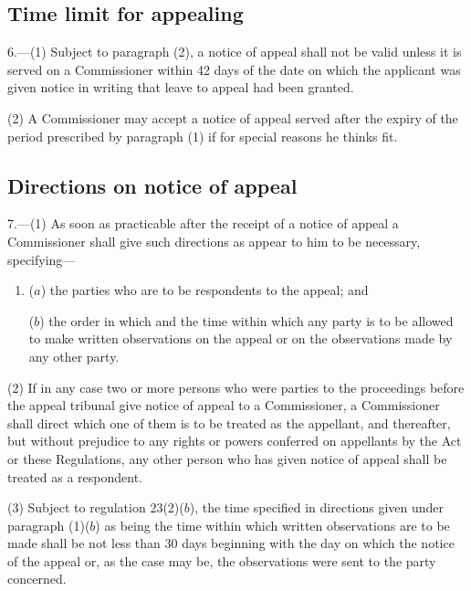 \documentclass[12pt,a4paper]{article}
\begin{document}

\subsection[6. Time limit for appealing]{Time limit for appealing}

6.—(1) Subject to paragraph (2), a notice of appeal shall not be valid unless it is served on a Commissioner within 42 days of the date on which the applicant was given notice in writing that leave to appeal had been granted.

(2) A Commissioner may accept a notice of appeal served after the expiry of the period prescribed by paragraph (1) if for special reasons he thinks fit.

\subsection[7. Directions on notice of appeal]{Directions on notice of appeal}

7.—(1) As soon as practicable after the receipt of a notice of appeal a Commissioner shall give such directions as appear to him to be necessary, specifying—
\begin{enumerate}\item[]
($a$) the parties who are to be respondents to the appeal; and

($b$) the order in which and the time within which any party is to be allowed to make written observations on the appeal or on the observations made by any other party.
\end{enumerate}

(2) If in any case two or more persons who were parties to the proceedings before the appeal tribunal give notice of appeal to a Commissioner, a Commissioner shall direct which one of them is to be treated as the appellant, and thereafter, but without prejudice to any rights or powers conferred on appellants by the Act or these Regulations, any other person who has given notice of appeal shall be treated as a respondent.

(3) Subject to regulation 23(2)($b$), the time specified in directions given under paragraph (1)($b$) as being the time within which written observations are to be made shall be not less than 30 days beginning with the day on which the notice of the appeal or, as the case may be, the observations were sent to the party concerned.
\end{document}
